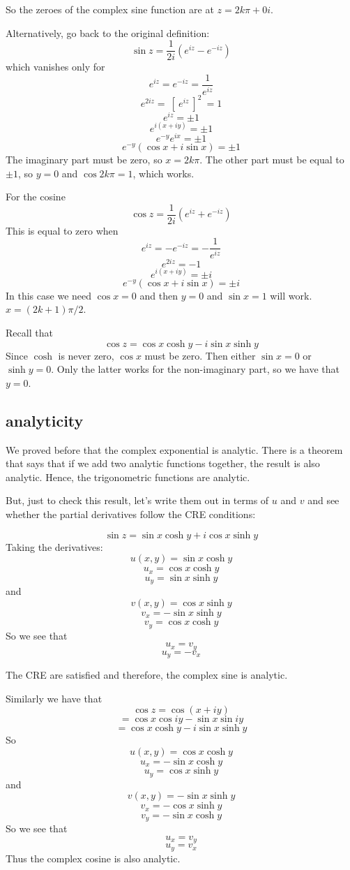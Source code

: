 \documentclass[11pt, oneside]{article}   	%
\begin{document}
So the zeroes of the complex sine function are at $z = 2k \pi + 0i$.

Alternatively, go back to the original definition:
\[ \sin z = \frac{1}{2i} (e^{iz} - e^{-iz}) \]
which vanishes only for 
\[ e^{iz} = e^{-iz} = \frac{1}{e^{iz}} \]
\[ e^{2iz} = \ [ \ e^{iz} \ ]^2 \ = 1 \]
\[ e^{iz} = \pm 1 \]
\[ e^{i(x + iy)} = \pm 1 \]
\[ e^{-y}e^{ix} = \pm 1 \]
\[ e^{-y} (\cos x + i \sin x) = \pm 1 \]
The imaginary part must be zero, so $x = 2k \pi$.  The other part must be equal to $\pm 1$, so $y = 0$ and $\cos 2k \pi = 1$, which works.

For the cosine
\[ \cos z = \frac{1}{2i} (e^{iz} + e^{-iz}) \]
This is equal to zero when
\[ e^{iz} = - e^{-iz} = -\frac{1}{e^{iz}} \]
\[ e^{2iz} = -1 \]
\[ e^{i(x + iy)} = \pm i \]
\[ e^{-y} (\cos x + i \sin x) = \pm i \]
In this case we need $\cos x = 0$ and then $y=0$ and $\sin x = 1$ will work.  $x = (2k + 1)\pi / 2$.

Recall that
\[ \cos z = \cos x \cosh y - i \sin x \sinh y \]
Since $\cosh$ is never zero, $\cos x$ must be zero.  Then either $\sin x = 0$ or $\sinh y = 0$.  Only the latter works for the non-imaginary part, so we have that $y = 0$.

\subsection*{analyticity}
We proved before that the complex exponential is analytic.  There is a theorem that says that if we add two analytic functions together, the result is also analytic.  Hence, the trigonometric functions are analytic.

But, just to check this result, let's write them out in terms of $u$ and $v$ and see whether the partial derivatives follow the CRE conditions:

\[ \sin z = \sin x \cosh y + i \cos x \sinh y \]
Taking the derivatives:
\[ u(x,y) =  \sin x \cosh y \]
\[ u_x = \cos x \cosh y \]
\[ u_y = \sin x \sinh y \]
and
\[ v(x,y) = \cos x \sinh y \]
\[ v_x = - \sin x \sinh y \]
\[ v_y = \cos x \cosh y \]
So we see that
\[ u_x = v_y \]
\[ u_y = -v_x \]

The CRE are satisfied and therefore, the complex sine is analytic.

Similarly we have that 
\[ \cos z = \cos (x + iy) \]
\[ = \cos x \cos iy - \sin x \sin iy \]
\[ = \cos x \cosh y - i \sin x \sinh y \]
So
\[ u(x,y) =  \cos x \cosh y \]
\[ u_x = - \sin x \cosh y \]
\[ u_y = \cos x \sinh y \]
and
\[ v(x,y) = -\sin x \sinh y \]
\[ v_x = -\cos x \sinh y \]
\[ v_y = -\sin x \cosh y \]
So we see that
\[ u_x = v_y \]
\[ u_y = v_x \]
Thus the complex cosine is also analytic.
\end{document}

